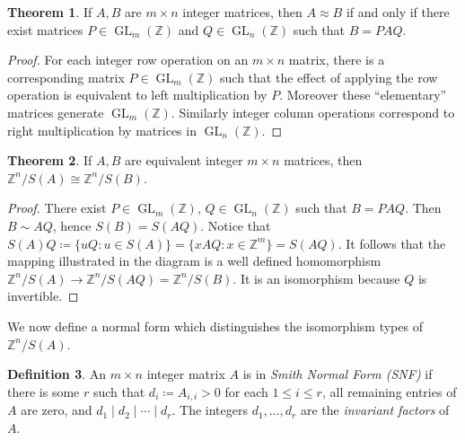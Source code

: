 \documentclass[12pt,a4paper,answers]{exam}
\newcommand{\Z}{\mathbb{Z}}
\DeclareMathOperator{\GL}{GL}
\theoremstyle{definition}
\newtheorem{theorem}{Theorem}[section]
\newtheorem{definition}[theorem]{Definition}
\begin{document}
\begin{theorem}
  If $A,B$ are $m\times n$ integer matrices, then $A\approx B$ if and only if there exist matrices $P\in\GL_m(\Z)$ and $Q\in\GL_n(\Z)$ such that $B=PAQ$.
\end{theorem}

\begin{proof}
  For each integer row operation on an $m\times n$ matrix, there is a corresponding matrix $P\in\GL_m(\Z)$ such that the effect of applying the row operation is equivalent to left multiplication by $P$. Moreover these ``elementary'' matrices generate $\GL_m(\Z)$. Similarly integer column operations correspond to right multiplication by matrices in $\GL_n(\Z)$.
\end{proof}

\begin{theorem}
  \label{commutative-diagram}
  If $A,B$ are equivalent integer $m\times n$ matrices, then $\Z^n/S(A)\cong\Z^n/S(B)$.
\end{theorem}

\begin{proof}
  There exist $P\in\GL_m(\Z)$, $Q\in\GL_n(\Z)$ such that $B=PAQ$. Then $B\sim AQ$, hence $S(B)=S(AQ)$. Notice that $S(A)Q\coloneqq\{uQ : u\in S(A)\}=\{xAQ : x\in\Z^m\}=S(AQ)$. It follows that the mapping illustrated in the diagram is a well defined homomorphism $\Z^n/S(A)\to\Z^n/S(AQ)=\Z^n/S(B)$. It is an isomorphism because $Q$ is invertible.

  \centering

\end{proof}

We now define a normal form which distinguishes the isomorphism types of $\Z^n/S(A)$.

\begin{definition}
  An $m\times n$ integer matrix $A$ is in \emph{Smith Normal Form (SNF)} if there is some $r$ such that $d_i\coloneqq A_{i,i}>0$ for each $1\leq i\leq r$, all remaining entries of $A$ are zero, and $d_1\mid d_2\mid \cdots \mid d_r$. The integers $d_1,\ldots,d_r$ are the \emph{invariant factors} of $A$.
\end{definition}
\end{document}
